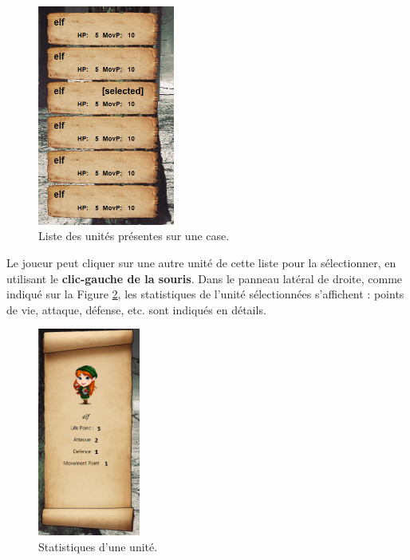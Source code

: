 		\begin{figure}
			\begin{center}
				\includegraphics[width=0.4\textwidth]{figure/unitscore.png}
			\end{center}
			\caption{Liste des unités présentes sur une case.}
			\label{fig:usco}
		\end{figure}
		
		
		Le joueur peut cliquer sur une autre unité de cette liste pour la sélectionner, en utilisant le {\bf clic-gauche de la souris}. Dans le panneau latéral de droite, comme indiqué sur la {\sc Figure }{\ref {fig:stat}}, les statistiques de l'unité sélectionnées s'affichent : points de vie, attaque, défense, etc. sont indiqués en détails.		
		
		\begin{figure}
			\begin{center}
				\includegraphics[width=0.3\textwidth]{figure/stats.png}
			\end{center}
			\caption{Statistiques d'une unité.}
			\label{fig:stat}
		\end{figure}
		
